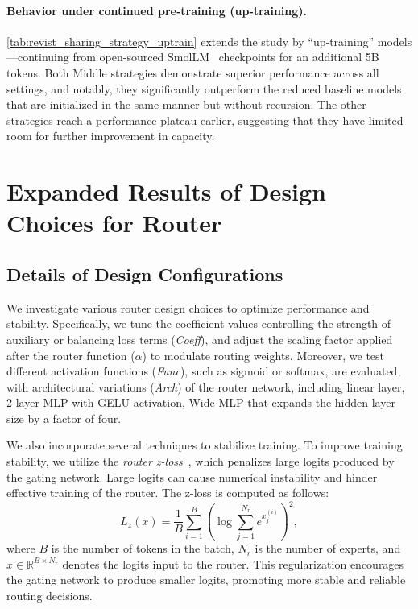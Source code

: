 


\clearpage
\paragraph{Behavior under continued pre‑training (up‑training).}
\autoref{tab:revist_sharing_strategy_uptrain} extends the study by ``up‑training'' models---continuing from open-sourced SmolLM~\citep{allal2024SmolLM} checkpoints for an additional 5B tokens.
Both Middle strategies demonstrate superior performance across all settings, and notably, they significantly outperform the reduced baseline models that are initialized in the same manner but without recursion.
The other strategies reach a performance plateau earlier, suggesting that they have limited room for further improvement in capacity.





\clearpage
\section{Expanded Results of Design Choices for Router}
\label{app:router_ablation}


\subsection{Details of Design Configurations}\label{appx:router_details}


We investigate various router design choices to optimize performance and stability. Specifically, we tune the coefficient values controlling the strength of auxiliary or balancing loss terms (\textit{Coeff}), and adjust the scaling factor applied after the router function ($\alpha$) to modulate routing weights. Moreover, we test different activation functions (\textit{Func}), such as sigmoid or softmax, are evaluated, with architectural variations (\textit{Arch}) of the router network, including linear layer, 2-layer MLP with GELU activation, Wide-MLP that expands the hidden layer size by a factor of four.

We also incorporate several techniques to stabilize training. To improve training stability, we utilize the \textit{router z-loss}~\citep{zoph2022st}, which penalizes large logits produced by the gating network. Large logits can cause numerical instability and hinder effective training of the router. The z-loss is computed as follows:
\begin{equation*}
L_z(x) = \frac{1}{B} \sum_{i=1}^B \left( \log \sum_{j=1}^{N_r} e^{x_j^{(i)}} \right)^2,
\end{equation*}
where $B$ is the number of tokens in the batch, $N_r$ is the number of experts, and $x \in \mathbb{R}^{B \times N_r}$ denotes the logits input to the router. This regularization encourages the gating network to produce smaller logits, promoting more stable and reliable routing decisions.


